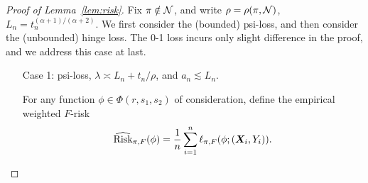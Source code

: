 \documentclass[11pt]{article}
\theoremstyle{plain}
\theoremstyle{definition}
\def\eriskF{\widehat{\textup{Risk}}_{\pi,F}}
\begin{document}
\begin{proof}[Proof of Lemma~\ref{lem:risk}]


Fix $\pi\notin\mathcal{N}$, and write $\rho=\rho(\pi,\mathcal{N})$, $L_n=t_n^{(\alpha+1)/(\alpha+2)}$. 
We first consider the (bounded) psi-loss, and then consider the (unbounded) hinge loss. The 0-1 loss incurs only slight difference in the proof, and we address this case at last. 

\begin{enumerate}[label={2.\arabic*},wide, labelwidth=!, labelindent=0pt]
\item[Case 1:] psi-loss, $\lambda\asymp L_n+t_n/\rho$, and $ a_n\lesssim L_n$.

For any function $\phi\in\Phi(r,s_1,s_2)$ of consideration, define the empirical weighted $F$-risk
\begin{equation}\label{eq:F}
\eriskF(\phi) = \frac{1}{n}\sum_{i=1}^n\ell_{\pi,F}(\phi; (\mX_i,Y_i)).
\end{equation}


\end{enumerate}
\end{proof}
\end{document}
